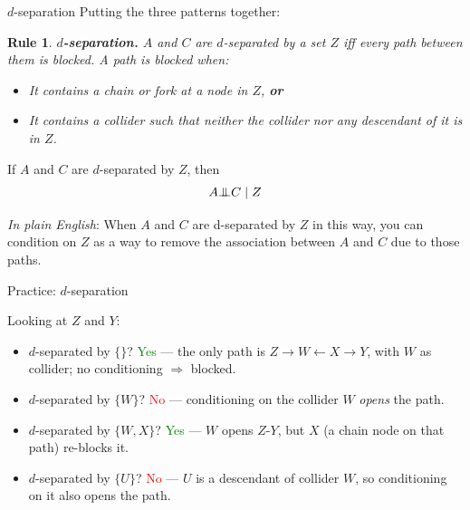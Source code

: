 \documentclass[xcolor=dvipsnames]{beamer}
\newcommand{\la}{\leftarrow}
\newtheorem{arule}{Rule}
\newcommand{\indep}{{\bot\negthickspace\negthickspace\bot}}
\begin{document}
\begin{frame}{$d$-separation}
\small
Putting the three patterns together:
\begin{arule}
\textbf{$d$-separation.}  $A$ and $C$ are $d$-separated by a set $Z$ iff \textit{every path} between them is blocked.  A path is blocked when:
\begin{itemize}
\footnotesize
\item It contains a \textit{chain} or \textit{fork} at a node in $Z$, \textbf{or}
\item It contains a \textit{collider} such that neither the collider nor any descendant of it is in $Z$.
\end{itemize}
\end{arule}

\bigskip
{} If $A$ and $C$ are $d$-separated by $Z$, then
$$A \indep C \mid Z$$

\medskip
{} \textit{In plain English}: When $A$ and $C$ are d-separated by $Z$ in this way, you can condition on $Z$ as a way to remove the association between $A$ and $C$ due to those paths.
\end{frame}


\begin{frame}{Practice: $d$-separation}
\begin{center}
\end{center}

\small
Looking at $Z$ and $Y$:
\begin{itemize}
\item<2-> $d$-separated by $\{\}$?  \textcolor{Green}{Yes} --- the only path is $Z\!\to\!W\!\la\!X\!\to\!Y$, with $W$ as collider; no conditioning $\Rightarrow$ blocked.
\item<4-> $d$-separated by $\{W\}$?  \textcolor{Red}{No} --- conditioning on the collider $W$ \textit{opens} the path.
\item<6-> $d$-separated by $\{W, X\}$?  \textcolor{Green}{Yes} --- $W$ opens $Z\text{-}Y$, but $X$ (a chain node on that path) re-blocks it.
\item<8-> $d$-separated by $\{U\}$?  \textcolor{Red}{No} --- $U$ is a descendant of collider $W$, so conditioning on it also opens the path.
\end{itemize}
\end{frame}
\end{document}
